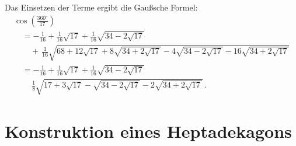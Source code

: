 \clearpage

Das Einsetzen der Terme ergibt die Gaußsche Formel:
\[
\begin{array}{l}
\displaystyle
\cos\left(\frac{360^\circ}{17}\right) \\[12pt]
\displaystyle
\quad=-\frac{1}{16}+\frac{1}{16}\sqrt{17} + 
     \frac{1}{16}\sqrt{34-2\sqrt{17}} \\[12pt]
\displaystyle
     \quad\quad+\,\frac{1}{16}\sqrt{
     68+12\sqrt{17} + 
     8\sqrt{34+2\sqrt{17}}-4\sqrt{34-2\sqrt{17}}
   -16
     \sqrt{34+2\sqrt{17}}
   }\\[12pt]
\displaystyle
\quad=-\frac{1}{16}+\frac{1}{16}\sqrt{17} + 
     \frac{1}{16}\sqrt{34-2\sqrt{17}}\\[12pt]
\displaystyle
\quad\quad\,\frac{1}{8}\sqrt{
     17+3\sqrt{17} - 
     \sqrt{34-2\sqrt{17}}
   -2
     \sqrt{34+2\sqrt{17}}
   }\,.
\end{array}
\]

\section{Konstruktion eines Heptadekagons}\label{s.construction}


